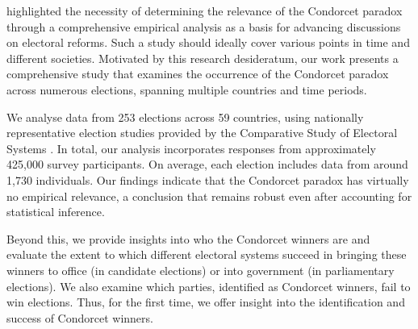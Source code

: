 \documentclass[12pt]{scrartcl}
\newcommand{\nbelections}{253 }
\newcommand{\nbcountries}{59 }
\begin{document}
\citet[Ch.~10.2]{Sen2017} highlighted the necessity of determining the relevance of the Condorcet paradox through a comprehensive empirical analysis as a basis for advancing discussions on electoral reforms. Such a study should ideally cover various points in time and different societies. Motivated by this research desideratum, our work presents a comprehensive study that examines the occurrence of the Condorcet paradox across numerous elections, spanning multiple countries and time periods. 

We analyse data from \nbelections elections across \nbcountries countries, using nationally representative election studies provided by the Comparative Study of Electoral Systems \citep{CSES2020}. In total, our analysis incorporates responses from approximately 425,000 survey participants. On average, each election includes data from around 1,730 individuals. Our findings indicate that the Condorcet paradox has virtually no empirical relevance, a conclusion that remains robust even after accounting for statistical inference. 

Beyond this, we provide insights into who the Condorcet winners are and evaluate the extent to which different electoral systems succeed in bringing these winners to office (in candidate elections) or into government (in parliamentary elections). We also examine which parties, identified as Condorcet winners, fail to win elections. Thus, for the first time, we offer insight into the identification and success of Condorcet winners.

\end{document}
